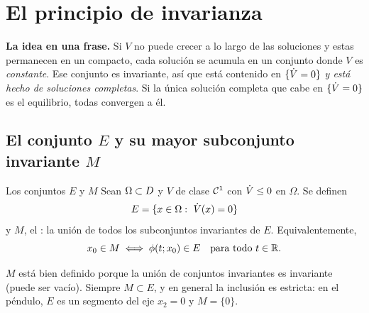 \section{El principio de invarianza}
\label{sec:iv-lasalle}

\begin{ideaclave}
\textbf{La idea en una frase.} Si $V$ no puede crecer a lo largo de las soluciones y estas permanecen en un compacto, cada solución se acumula en un conjunto donde $V$ es \emph{constante}. Ese conjunto es invariante, así que está contenido en $\{\dot V=0\}$ \emph{y está hecho de soluciones completas}. Si la única solución completa que cabe en $\{\dot V=0\}$ es el equilibrio, todas convergen a él.
\end{ideaclave}

\subsection{El conjunto $E$ y su mayor subconjunto invariante $M$}

\begin{definicion}[label=def:iv-EM]{Los conjuntos $E$ y $M$}
Sean $\Omega\subset D$ y $V$ de clase $\mathcal{C}^{1}$ con $\dot V\le0$ en $\Omega$. Se definen
\[
  E=\{x\in\Omega:\ \Vdot(x)=0\}
\]
y $M$, el : la unión de todos los subconjuntos invariantes de $E$. Equivalentemente,
\[
  x_0\in M\iff\phi(t;x_0)\in E\quad\text{para todo }t\in\mathbb{R} .
\]
\end{definicion}

$M$ está bien definido porque la unión de conjuntos invariantes es invariante (puede ser vacío). Siempre $M\subset E$, y en general la inclusión es estricta: en el péndulo, $E$ es un segmento del eje $x_2=0$ y $M=\{0\}$.

